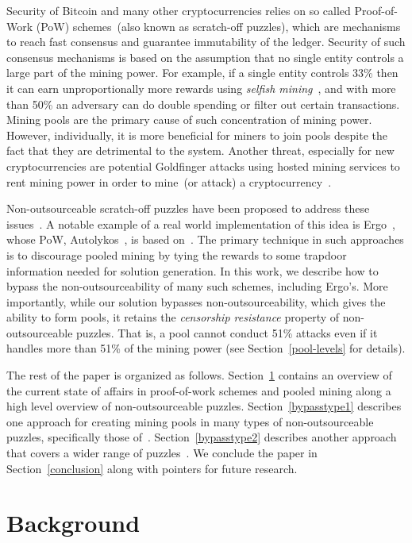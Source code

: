 \documentclass{llncs}
\newcommand{\powname}{Autolykos\xspace}
\begin{document}
Security of Bitcoin and many other cryptocurrencies relies on so called Proof-of-Work (PoW) schemes~(also known as scratch-off puzzles), which are mechanisms to reach fast consensus and guarantee immutability of the ledger. Security of such consensus mechanisms is based on the assumption that no single entity controls a large part of the mining power. For example, if a single entity controls
33\% then it can earn unproportionally more rewards using {\em selfish mining}~\cite{selfish}, and with more than 50\% an adversary can do double spending or filter out certain transactions. Mining pools are the primary cause of such concentration of mining power. 
However,  individually, it is more beneficial for miners to join pools despite the fact that they are detrimental to the system. Another threat, especially for new cryptocurrencies are potential Goldfinger attacks using hosted mining services to rent mining power in order to mine~(or attack) a cryptocurrency~\cite{goldfinger}.

Non-outsourceable scratch-off puzzles have been proposed to address these issues~\cite{miller2015nonoutsourceable,daian2017short}. A notable example of a real world implementation of this idea is Ergo~\cite{ergo}, whose PoW, \powname~\cite{autolykos}, is based on~\cite{daian2017short}. The primary technique in such approaches is to discourage pooled mining by tying the rewards to some trapdoor information needed for solution generation. In this work, we describe how to bypass the non-outsourceability of many such schemes, including Ergo's. 
More importantly, while our solution bypasses non-outsourceability, which gives the ability to form pools, it retains the {\em censorship resistance} property of non-outsourceable puzzles. That is, a pool cannot conduct 51\% attacks even if it handles more than 51\% of the mining power (see Section~\ref{pool-levels} for details). 

The rest of the paper is organized as follows. Section~\ref{background} contains an overview of the current state of affairs in proof-of-work schemes and pooled mining along a high level overview of non-outsourceable puzzles. Section~\ref{bypasstype1} describes one approach for creating mining pools in many types of non-outsourceable puzzles, specifically those of~\cite{daian2017short}. Section~\ref{bypasstype2} describes another approach that covers a wider range of puzzles~\cite{daian2017short,miller2015nonoutsourceable}. We conclude the paper in Section~\ref{conclusion} along with pointers for future research.
\section{Background}
\label{background}
\end{document}
